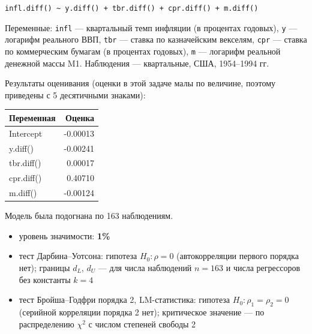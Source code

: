 \documentclass[
  russian,
]{article}
\newcounter{none} %
\providecommand{\tightlist}{%
  \setlength{\itemsep}{0pt}\setlength{\parskip}{0pt}}
\begin{document}
\texttt{infl.diff()\ \textasciitilde{}\ y.diff()\ +\ tbr.diff()\ +\ cpr.diff()\ +\ m.diff()}

Переменные: \texttt{infl} --- квартальный темп инфляции (в процентах
годовых), \texttt{y} --- логарифм реального ВВП, \texttt{tbr} --- ставка
по казначейским векселям, \texttt{cpr} --- ставка по коммерческим
бумагам (в процентах годовых), \texttt{m} --- логарифм реальной денежной
массы M1. Наблюдения --- квартальные, США, 1954--1994 гг.

Результаты оценивания (оценки в этой задаче малы по величине, поэтому
приведены с 5 десятичными знаками):

{\def\LTcaptype{none} %
\begin{longtable}[]{@{}lr@{}}
\toprule\noalign{}
Переменная & Оценка \\
\midrule\noalign{}
\endhead
\bottomrule\noalign{}
\endlastfoot
Intercept & -0.00013 \\
y.diff() & -0.00241 \\
tbr.diff() & 0.00017 \\
cpr.diff() & 0.40710 \\
m.diff() & -0.00124 \\
\end{longtable}
}

Модель была подогнана по 163 наблюдениям.

\begin{tcolorbox}[enhanced jigsaw, arc=.35mm, bottomrule=.15mm, bottomtitle=1mm, breakable, colback=white, colbacktitle=quarto-callout-important-color!10!white, colframe=quarto-callout-important-color-frame, coltitle=black, left=2mm, leftrule=.75mm, opacityback=0, opacitybacktitle=0.6, rightrule=.15mm, title=\textcolor{quarto-callout-important-color}{\faExclamation}\hspace{0.5em}{Условия теста}, titlerule=0mm, toprule=.15mm, toptitle=1mm]

\begin{itemize}
\tightlist
\item
  уровень значимости: \textbf{1\%}
\item
  тест Дарбина--Уотсона: гипотеза \(H_0:\rho=0\) (автокорреляции первого
  порядка нет); границы \(d_L\), \(d_U\) --- для числа наблюдений
  \(n=163\) и числа регрессоров без константы \(k=4\)
\item
  тест Бройша--Годфри порядка 2, LM-статистика: гипотеза
  \(H_0:\rho_1=\rho_2=0\) (серийной корреляции порядка 2 нет);
  критическое значение --- по распределению \(\chi^2\) с числом степеней
  свободы 2
\end{itemize}

\end{tcolorbox}
\end{document}

